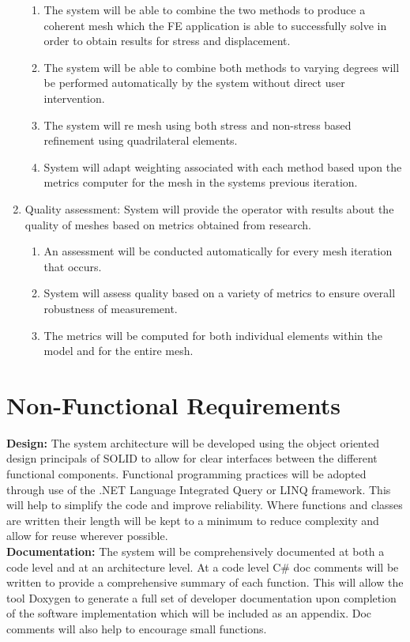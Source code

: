 \begin{enumerate}
\begin{enumerate}
\item The system will be able to combine the two methods to produce a coherent mesh which the FE application is able to successfully solve in order to obtain results for stress and displacement.
\item The system will be able to combine both methods to varying degrees will be performed automatically by the system without direct user intervention.
\item The system will re mesh using both stress and non-stress based refinement using quadrilateral elements.
\item System will adapt weighting associated with each method based upon the metrics computer for the mesh in the systems previous iteration.
\end{enumerate}

\item Quality assessment: System will provide the operator with results about the quality of meshes based on metrics obtained from research.

\begin{enumerate}
\item An assessment will be conducted automatically for every mesh iteration that occurs.
\item System will assess quality based on a variety of metrics to ensure overall robustness of measurement. 
\item The metrics will be computed for both individual elements within the model and for the entire mesh.
\end{enumerate}
\end{enumerate}

\section{Non-Functional Requirements}


\textbf{Design:} The system architecture will be developed using the object oriented design principals of SOLID to allow for clear interfaces between the different functional components. Functional programming practices will be adopted through use of the .NET Language Integrated Query or LINQ framework. This will help to simplify the code and improve reliability. Where functions and classes are written their length will be kept to a minimum to reduce complexity and allow for reuse wherever possible. \\ 

\noindent
\textbf{Documentation:} The system will be comprehensively documented at both a code level and at an architecture level. At a code level C\# doc comments will be written to provide a comprehensive summary of each function. This will allow the tool Doxygen \cite{Doxygen} to generate a full set of developer documentation upon completion of the software implementation which will be included as an appendix. Doc comments will also help to encourage small functions. \\

